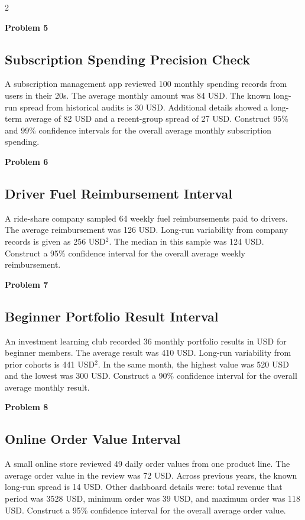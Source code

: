 \documentclass[12pt]{article}
\newcommand{\SubsectionBox}[1]{%
\noindent\colorbox{gray!30}{\parbox{\linewidth}{\textbf{#1}}}\par\vspace{0.35cm}%
}
\begin{document}
\begin{multicols}{2}
\vspace{0.5cm}
\SubsectionBox{Problem 5}
\subsection*{Subscription Spending Precision Check}
A subscription management app reviewed 100 monthly spending records from users in their 20s.
		The average monthly amount was 84 USD.
		The known long-run spread from historical audits is 30 USD.
		Additional details showed a long-term average of 82 USD and a recent-group spread of 27 USD.
		Construct 95\% and 99\% confidence intervals for the overall average monthly subscription spending.

\vspace{0.5cm}
\SubsectionBox{Problem 6}
\subsection*{Driver Fuel Reimbursement Interval}
A ride-share company sampled 64 weekly fuel reimbursements paid to drivers.
		The average reimbursement was 126 USD.
		Long-run variability from company records is given as 256 USD$^2$.
		The median in this sample was 124 USD.
		Construct a 95\% confidence interval for the overall average weekly reimbursement.

\vspace{0.5cm}
\SubsectionBox{Problem 7}
\subsection*{Beginner Portfolio Result Interval}
An investment learning club recorded 36 monthly portfolio results in USD for beginner members.
		The average result was 410 USD.
		Long-run variability from prior cohorts is 441 USD$^2$.
		In the same month, the highest value was 520 USD and the lowest was 300 USD.
		Construct a 90\% confidence interval for the overall average monthly result.

\vspace{0.5cm}
\SubsectionBox{Problem 8}
\subsection*{Online Order Value Interval}
A small online store reviewed 49 daily order values from one product line.
		The average order value in the review was 72 USD.
		Across previous years, the known long-run spread is 14 USD.
		Other dashboard details were: total revenue that period was 3528 USD, minimum order was 39 USD, and maximum order was 118 USD.
		Construct a 95\% confidence interval for the overall average order value.


\end{multicols}
\end{document}
